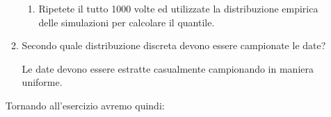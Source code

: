 \documentclass[a4paper,12pt]{article}
\begin{document}
\begin{enumerate}
\begin{enumerate}
\begin{enumerate}
\item  Ripetete il tutto 1000 volte ed utilizzate la distribuzione empirica
delle simulazioni per calcolare il quantile.
\end{enumerate}

\item  Secondo quale distribuzione discreta devono essere campionate le date?

Le date devono essere estratte casualmente campionando in maniera uniforme.
\end{enumerate}
Tornando all'esercizio avremo quindi: 
\end{enumerate}
\end{document}
